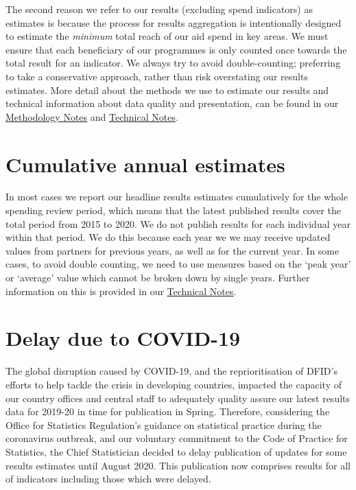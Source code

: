 The second reason we refer to our results (excluding spend indicators) as estimates is because the process for results aggregation is intentionally designed to estimate the \textsl{minimum} total reach of our aid spend in key areas. %
We must ensure that each beneficiary of our programmes is only counted once towards the total result for an indicator. %
We always try to avoid double-counting; preferring to take a conservative approach, rather than risk overstating our results estimates. %
More detail about the methods we use to estimate our results and technical information about data quality and presentation, can be found in our \href{Methodology Notes}{Methodology Notes} and \href{Technical Notes}{Technical Notes}. %

\section*{Cumulative annual estimates}
In most cases we report our headline results estimates cumulatively for the whole spending review period, which means that the latest published results cover the total period from 2015 to 2020. %
We do not publish results for each individual year within that period. %
We do this because each year we we may receive updated values from partners for previous years, as well as for the current year. %
In some cases, to avoid double counting, we need to use measures based on the `peak year' or `average' value which cannot be broken down by single years. %
Further information on this is provided in our \href{Technical Notes}{Technical Notes}.

\section*{Delay due to COVID-19}
The global disruption caused by COVID-19, and the reprioritisation of DFID's efforts to help tackle the crisis in developing countries, impacted the capacity of our country offices and central staff to adequately quality assure our latest results data for 2019-20 in time for publication in Spring. %
Therefore, considering the Office for Statistics Regulation's guidance on statistical practice during the coronavirus outbreak, and our voluntary commitment to the Code of Practice for Statistics, the Chief Statistician decided to delay publication of updates for some results estimates until August 2020. %
This publication now comprises results for all of indicators including those which were delayed. %


\newpage

